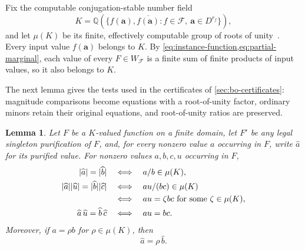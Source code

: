 \documentclass[11pt,letterpaper,onecolumn]{article}
\theoremstyle{plain}
\newtheorem{lemma}[lemma]{Lemma}
\theoremstyle{definition}
\theoremstyle{remark}
\newcommand{\cF}{\mathcal F}
\DeclarePairedDelimiter{\abs}{\lvert}{\rvert}
\begin{document}
Fix the computable conjugation-stable number field
\begin{equation}
  K=\mathbb Q\left(
      \{f(\mathbf a),\overline{f(\mathbf a)}:
        f\in\cF,\ \mathbf a\in D^{r_f}\}
    \right),
  \label{eq:working-field}
\end{equation}
and let $\mu(K)$ be its finite, effectively computable group of roots of
unity~\cite[Algorithm~4.9.10]{Cohen1993}.  Every input value $f(\mathbf a)$ belongs to $K$.
By \cref{eq:instance-function,eq:partial-marginal}, each value of every
$F\in W_{\cF}$ is a finite sum of finite products of input values, so it
also belongs to $K$.

The next lemma gives the tests used in the certificates of
\cref{sec:bo-certificates}: magnitude comparisons become equations with a
root-of-unity factor, ordinary minors retain their original equations, and
root-of-unity ratios are preserved.

\begin{lemma}
\label{lem:intrinsic-purification-tests}
Let $F$ be a $K$-valued function on a finite domain, let $F'$ be any legal singleton
purification of $F$, and, for every nonzero value $a$ occurring in $F$,
write $\widehat a$ for its purified value.  For nonzero values $a,b,c,u$
occurring in $F$,
\begin{align}
  \abs{\widehat a}=\abs{\widehat b}
  &\quad\Longleftrightarrow\quad
  a/b\in\mu(K),
  \label{eq:intrinsic-equal-magnitude}\\
  \abs{\widehat a}\abs{\widehat u}
     =\abs{\widehat b}\abs{\widehat c}
  &\quad\Longleftrightarrow\quad
  au/(bc)\in\mu(K)\notag\\
  &\quad\Longleftrightarrow\quad
  au=\zeta bc
  \text{ for some }\zeta\in\mu(K),
  \label{eq:intrinsic-magnitude-minor}\\
  \widehat a\,\widehat u=\widehat b\,\widehat c
  &\quad\Longleftrightarrow\quad
  au=bc.
  \label{eq:intrinsic-ordinary-minor}
\end{align}
Moreover, if $a=\rho b$ for $\rho\in\mu(K)$, then
\begin{equation}
  \widehat a=\rho\,\widehat b.
  \label{eq:purification-root-covariance}
\end{equation}
\end{lemma}
\end{document}
